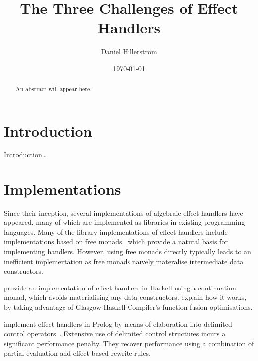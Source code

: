 \documentclass[a4paper,twoside,10pt]{amsart}
\title{The Three Challenges of Effect Handlers}
\author[D. Hillerström]{Daniel Hillerström}
\date{\today}
\begin{document}
\maketitle


\begin{abstract}
An abstract will appear here\dots
\end{abstract}

\tableofcontents

\section{Introduction}
Introduction\dots

\section{Implementations}
Since their inception, several implementations of algebraic effect
handlers have appeared, many of which are implemented as libraries in
existing programming languages.
%
%
Many of the library implementations of effect handlers include
implementations based on free monads~\cite{KammarLO13, KiselyovSS13,
  KiselyovI15, Brady13, WuSH14} which provide a natural basis for
implementing handlers. However, using free monads directly typically
leads to an inefficient implementation as free monads naïvely
materalise intermediate data constructors.

\citet{KammarLO13} provide an implementation of effect handlers in
Haskell using a continuation monad, which avoids materialising any
data constructors. \citet{WuS15} explain how it works, by taking
advantage of Glasgow Haskell Compiler's function fusion
optimisations.

\citet{SalehS16} implement effect handlers in Prolog by means of
elaboration into delimited control
operators~\cite{SchrijversDDW13}. Extensive use of delimited control
structures incurs a significant performance penalty. They recover
performance using a combination of partial evaluation and effect-based
rewrite rules.
\end{document}
